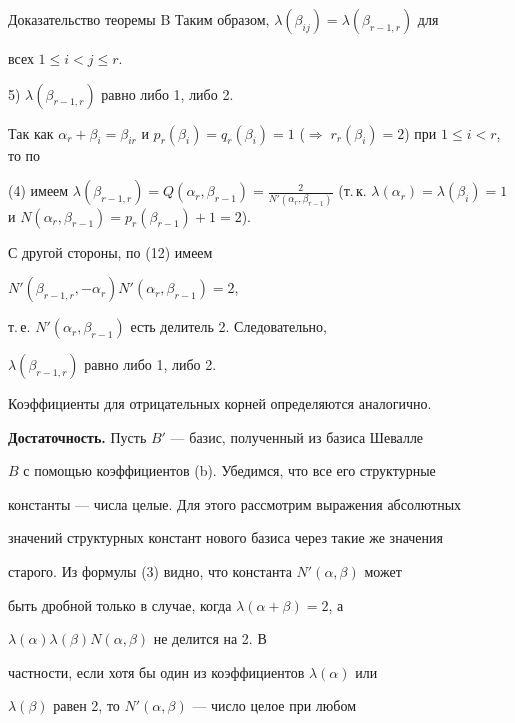 \begin{pf*}{Доказательство теоремы B}
\noindent{}Таким образом, $\lambda(\beta_{ij})=\lambda(\beta_{r-1,r})$ для


всех $1\le i<j\le r$.





5) $\lambda(\beta_{r-1,r})$ равно либо 1, либо 2.





\noindent{}Так как $\alpha_r+\beta_i=\beta_{ir}$ и $p_r(\beta_i)=


q_r(\beta_i)=1$ ($\Rightarrow\;r_r(\beta_i)=2$) при $1\le i<r$, то по


(4) имеем $\lambda(\beta_{r-1,r})=Q(\alpha_r,\beta_{r-1})=


\frac2{N'(\alpha_r,\beta_{r-1})}$ (т.\,к. $\lambda(\alpha_r)=


\lambda(\beta_i)=1$ и $N(\alpha_r,\beta_{r-1})=p_r(\beta_{r-1})+1=2$).


С другой стороны, по (12) имеем


$N'(\beta_{r-1,r},-\alpha_r)N'(\alpha_r,\beta_{r-1})=2$,


т.\,е. $N'(\alpha_r,\beta_{r-1})$ есть делитель 2.  Следовательно,


$\lambda(\beta_{r-1,r})$ равно либо 1, либо 2.





Коэффициенты для отрицательных корней определяются аналогично.


\medskip





{\bf Достаточность.} Пусть $B'$ --- базис, полученный из базиса Шевалле


$B$ с помощью коэффициентов (b). Убедимся, что все его структурные


константы --- числа целые. Для этого рассмотрим выражения абсолютных


значений структурных констант нового базиса через такие же значения


старого. Из формулы (3) видно, что константа $N'(\alpha,\beta)$ может


быть дробной только в случае, когда $\lambda(\alpha+\beta)=2$, а


$\lambda(\alpha)\lambda(\beta)N(\alpha,\beta)$ не делится на 2. В


частности, если хотя бы один из коэффициентов $\lambda(\alpha)$ или


$\lambda(\beta)$ равен 2, то $N'(\alpha,\beta)$ --- число целое при любом



\end{pf*}
